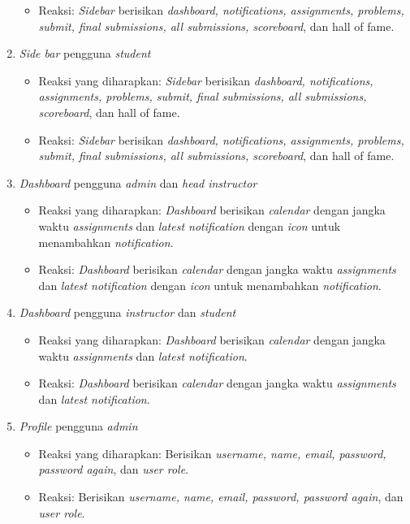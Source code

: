 \begin{enumerate}
\begin{itemize}
	 	\item Reaksi: \textit{Sidebar} berisikan \textit{dashboard, notifications, assignments, problems, submit, final submissions, all submissions, scoreboard}, dan hall of fame.
	 \end{itemize}
	 \item \textit{Side bar} pengguna \textit{student}
	 \begin{itemize}
	 	\item Reaksi yang diharapkan: \textit{Sidebar} berisikan \textit{dashboard, notifications, assignments, problems, submit, final submissions, all submissions, scoreboard}, dan hall of fame.
	 	\item Reaksi: \textit{Sidebar} berisikan \textit{dashboard, notifications, assignments, problems, submit, final submissions, all submissions, scoreboard}, dan hall of fame.
	 \end{itemize}
	 \item \textit{Dashboard} pengguna \textit{admin} dan \textit{head instructor}
	 \begin{itemize}
	 	\item Reaksi yang diharapkan: \textit{Dashboard} berisikan \textit{calendar} dengan jangka waktu \textit{assignments} dan \textit{latest notification} dengan \textit{icon} untuk menambahkan \textit{notification}.
	 	\item Reaksi: \textit{Dashboard} berisikan \textit{calendar} dengan jangka waktu \textit{assignments} dan \textit{latest notification} dengan \textit{icon} untuk menambahkan \textit{notification}.
	 \end{itemize}
	 \item \textit{Dashboard} pengguna \textit{instructor} dan \textit{student}
	 \begin{itemize}
	 	\item Reaksi yang diharapkan: \textit{Dashboard} berisikan \textit{calendar} dengan jangka waktu \textit{assignments} dan \textit{latest notification}.
	 	\item Reaksi: \textit{Dashboard} berisikan \textit{calendar} dengan jangka waktu \textit{assignments} dan \textit{latest notification}.
	 \end{itemize}
	 \item \textit{Profile} pengguna \textit{admin}
	 \begin{itemize}
	 	\item Reaksi yang diharapkan: Berisikan \textit{username, name, email, password, password again}, dan \textit{user role}.
	 	\item Reaksi: Berisikan \textit{username, name, email, password, password again}, dan \textit{user role}.

\end{itemize}
\end{enumerate}
